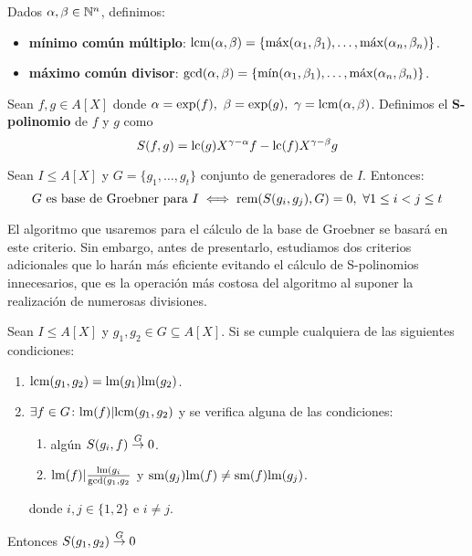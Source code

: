 \begin{definicion}
    Dados $\alpha,\beta \in \Nn$, definimos:
    \begin{itemize}
        \item \textbf{mínimo común múltiplo}: $\lcm(\alpha,\beta) = \{\Max(\alpha_1, \beta_1),\dots, \Max(\alpha_n, \beta_n)\}$.
        \item \textbf{máximo común divisor}: $\gcd(\alpha,\beta) = \{\Min(\alpha_1, \beta_1),\dots, \Max(\alpha_n, \beta_n)\}$.
    \end{itemize}
\end{definicion}

\begin{definicion}
    Sean $f,g \in A[X]$ donde $\alpha=\exp(f),\ \beta=\exp(g),\ \gamma = \lcm(\alpha,\beta)$. Definimos el \textbf{S-polinomio} de $f$ y $g$ como
    \begin{equation*}
        S(f,g) = \lc(g)X^{\gamma-\alpha}f - \lc(f)X^{\gamma-\beta}g
    \end{equation*}
\end{definicion}

\begin{teorema}\label{t:criterio}
    Sean $I\le A[X]$ y $G=\{g_1,\dots, g_t\}$ conjunto de generadores de $I$. Entonces:
    \begin{equation*}
        G \text{ es base de Groebner para } I \iff \rem(S(g_i,g_j), G)=0,\ \forall 1\le i<j\le t
    \end{equation*}
\end{teorema}

El algoritmo que usaremos para el cálculo de la base de Groebner se basará en este criterio. Sin embargo, antes de presentarlo, estudiamos dos criterios adicionales que lo harán más eficiente evitando el cálculo de S-polinomios innecesarios, que es la operación más costosa del algoritmo al suponer la realización de numerosas divisiones.

\begin{teorema}\label{t:criterios}
    Sean $I\le A[X]$ y $g_1,g_2 \in G\subseteq A[X]$. Si se cumple cualquiera de las siguientes condiciones:
    \begin{enumerate}
        \item $\lcm(g_1,g_2) = \lm(g_1)\lm(g_2)$.
        \item $\exists f\in G \colon \lm(f) \vert \lcm(g_1,g_2)$ y se verifica alguna de las condiciones:
        \begin{enumerate}
            \item algún $S(g_i,f)\reduces 0$.
            \item $\lm(f)\vert \frac{\lm(g_i}{\gcd(g_1,g_2}$ y $\sm(g_j)\lm(f) \neq \sm(f)\lm(g_j)$.
        \end{enumerate}
        donde $i,j\in\{1,2\}$ e $i\neq j$.
    \end{enumerate}
    Entonces $S(g_1,g_2)\reduces 0$
\end{teorema}

